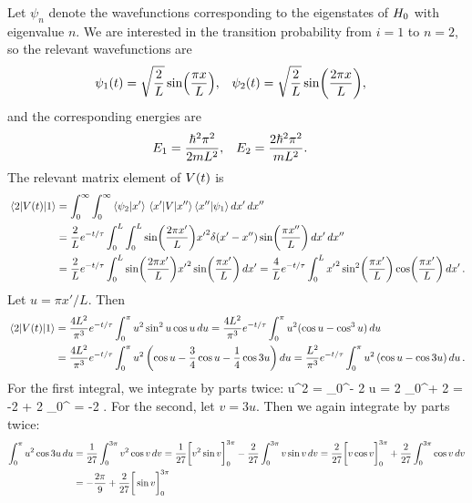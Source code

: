 \begin{solution}
	Let $\psi_n$ denote the wavefunctions corresponding to the eigenstates of $H_0$ with eigenvalue $n$.  We are interested in the transition probability from $i = 1$ to $n = 2$, so the relevant wavefunctions are
	\begin{align*}
		\psi_1(t) &= \sqrt{\frac{2}{L}} \sin(\frac{\pi x}{L}), &
		\psi_2(t) &= \sqrt{\frac{2}{L}} \sin(\frac{2\pi x}{L}),
	\end{align*}
	and the corresponding energies are
	\begin{align*}
		E_1 &= \frac{\hbar^2 \pi^2}{2 m L^2}, &
		E_2 &= \frac{2 \hbar^2 \pi^2}{m L^2}.
	\end{align*}
	The relevant matrix element of $V(t)$ is
	\begin{align*}
		\mel{2}{V(t)}{1} &= \int_0^\infty \int_0^\infty \braket{\psi_2}{x'} \mel{x'}{V}{x''} \braket{x''}{\psi_1} \dd{x'} \dd{x''} \\
		&= \frac{2}{L} e^{-t / \tau} \int_0^L \int_0^L \sin(\frac{2\pi x'}{L}) {x'}^2 \delta(x' - x'') \sin(\frac{\pi x''}{L}) \dd{x'} \dd{x''} \\
		&= \frac{2}{L} e^{-t / \tau} \int_0^L \sin(\frac{2\pi x'}{L}) {x'}^2 \sin(\frac{\pi x'}{L}) \dd{x'}
		= \frac{4}{L} e^{-t / \tau} \int_0^L {x'}^2 \sin[2](\frac{\pi x'}{L}) \cos(\frac{\pi x'}{L}) \dd{x'}.
	\end{align*}
	Let $u = \pi x' / L$.  Then
	\begin{align*}
		\mel{2}{V(t)}{1} &= \frac{4 L^2}{\pi^3} e^{-t / \tau} \int_0^\pi u^2 \sin^2{u} \cos{u} \dd{u}
		= \frac{4 L^2}{\pi^3} e^{-t / \tau} \int_0^\pi u^2 (\cos{u} - \cos^3{u}) \dd{u} \\
		&= \frac{4 L^2}{\pi^3} e^{-t / \tau} \int_0^\pi u^2 \left( \cos{u} - \frac{3}{4} \cos{u} - \frac{1}{4} \cos{3u} \right) \dd{u}
		= \frac{L^2}{\pi^3} e^{-t / \tau} \int_0^\pi u^2 \left( \cos{u} - \cos{3u} \right) \dd{u}.
	\end{align*}
	For the first integral, we integrate by parts twice:
	\beq
		\intopi u^2  \du = _0^\pi - 2 \intopi u  \du
		= 2 _0^\pi + 2 \intopi {} \du
		= -2 \pi + 2 _0^\pi
		= -2 \pi.
	\eeq
	For the second, let $v = 3u$.  Then we again integrate by parts twice:
	\begin{align*}
		\intopi u^2 \cos{3u} \du &= \frac{1}{27} \intoepi v^2 \cos{v} \ddv
		= \frac{1}{27} \bigg[ v^2 \sin{v} \bigg]_0^{3\pi} - \frac{2}{27} \intoepi v \sin{v} \ddv
		= \frac{2}{27} \bigg[ v \cos{v} \bigg]_0^{3\pi} + \frac{2}{27} \intoepi \cos{v} \ddv \\
		&= -\frac{2\pi}{9} + \frac{2}{27} \bigg[ \sin{v} \bigg]_0^{3\pi}

\end{align*}
\end{solution}
